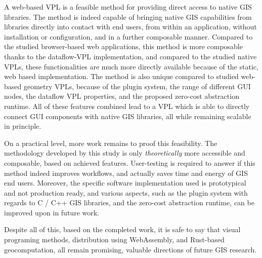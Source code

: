 A web-based VPL is a feasible method for providing direct access to native \ac{GIS} libraries.
The method is indeed capable of bringing native GIS capabilities from libraries directly into contact with end users, from within an application, without installation or configuration, and in a further composable manner. 
Compared to the studied browser-based web applications, this method is more composable thanks to the dataflow-VPL implementation, 
and compared to the studied native VPLs, these functionalities are much more directly available because of the static, web based implementation.
The method is also unique compared to studied web-based geometry VPLs, because of the plugin system, the range of different \ac{GUI} nodes, the dataflow VPL properties, and the proposed zero-cost abstraction runtime. 
All of these features combined lead to a VPL which is able to directly connect \ac{GUI} components with native \ac{GIS} libraries, all while remaining scalable in principle.

On a practical level, more work remains to proof this feasibility.
The methodology developed by this study is only \emph{theoretically} more accessible and composable, based on achieved features.
User-testing is required to answer if this method indeed improves workflows, and actually saves time and energy of \ac{GIS} end users. 
Moreover, the specific software implementation used is prototypical and not production ready, and various aspects, such as the plugin system with regards to C / C++ \ac{GIS} libraries, and the zero-cost abstraction runtime, can be improved upon in future work.

Despite all of this, based on the completed work, it is safe to say that visual programing methods, distribution using WebAssembly, and Rust-based geocomputation, all remain promising, valuable directions of future \ac{GIS} research.





